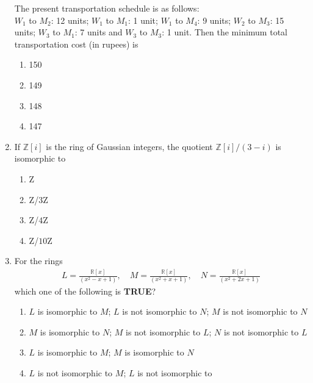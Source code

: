 \documentclass[journal]{IEEEtran}
\numberwithin{equation}{enumi}
\numberwithin{figure}{enumi}
\begin{document}
\begin{enumerate}
The present transportation schedule is as follows: \\
$W_1$ to $M_2$: 12 units; $W_1$ to $M_1$: 1 unit; $W_1$ to $M_4$: 9 units; $W_2$ to $M_3$: 15 units; $W_3$ to $M_1$: 7 units and $W_3$ to $M_3$: 1 unit. Then the minimum total transportation cost (in rupees) is
\hfill{}
\begin{multicols}{4}
\begin{enumerate}
\item  150
\item  149
\item  148 
\item  147 
\end{enumerate}
\end{multicols}


\item If $\mathbb{Z}[i]$ is the ring of Gaussian integers, the quotient $\mathbb{Z}[i]/(3-i)$ is isomorphic to
\hfill{}
\begin{multicols}{4}
\begin{enumerate}
\item  Z
\item  Z/$3$Z
\item  Z/$4$Z
\item  Z/$10$Z 
\end{enumerate}
\end{multicols}



\newpage
\item For the rings
\begin{align*}
L = \frac{\mathbb{R}[x]}{(x^2 - x + 1)}, \quad
M = \frac{\mathbb{R}[x]}{(x^2 + x + 1)}, \quad
N = \frac{\mathbb{R}[x]}{(x^2 + 2x + 1)}
\end{align*}
which one of the following is \textbf{TRUE}?
\hfill{}
\begin{enumerate}
    \item $L$ is isomorphic to $M$; $L$ is not isomorphic to $N$; $M$ is not isomorphic to $N$
    \item  $M$ is isomorphic to $N$; $M$ is not isomorphic to $L$; $N$ is not isomorphic to $L$
    \item $L$ is isomorphic to $M$; $M$ is isomorphic to $N$
    \item $L$ is not isomorphic to $M$; $L$ is not isomorphic to
    \end{enumerate}
    


\end{enumerate}
\end{document}
